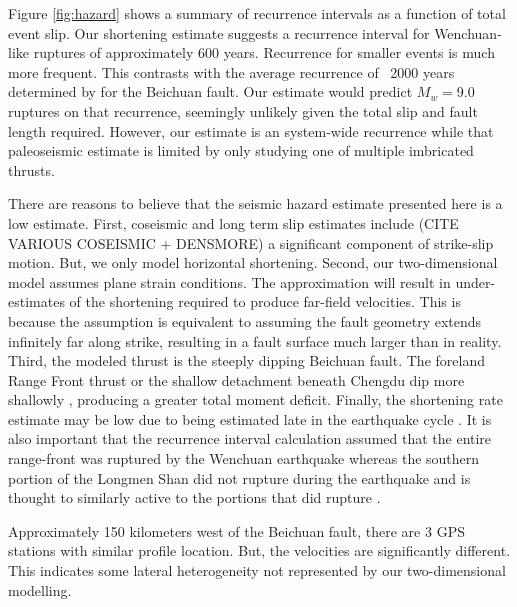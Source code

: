 \documentclass[12pt]{article}
\begin{document}
Figure \ref{fig:hazard} shows a summary of recurrence intervals as a function of total event slip. Our shortening estimate suggests a recurrence interval for Wenchuan-like ruptures of approximately 600 years. Recurrence for smaller events is much more frequent. This contrasts with the average recurrence of ~2000 years determined by \citep{Ran2010} for the Beichuan fault. Our estimate would predict $M_w = $9.0 ruptures on that recurrence, seemingly unlikely given the total slip and fault length required. However, our estimate is an system-wide recurrence while that paleoseismic estimate is limited by only studying one of multiple imbricated thrusts. 

There are reasons to believe that the seismic hazard estimate presented here is a low estimate.  First, coseismic and long term slip estimates include (CITE VARIOUS COSEISMIC + DENSMORE) a significant component of strike-slip motion. But, we only model horizontal shortening.  Second, our two-dimensional model assumes plane strain conditions.  The approximation will result in under-estimates of the shortening required to produce far-field velocities.  This is because the assumption is equivalent to assuming the fault geometry extends infinitely far along strike, resulting in a fault surface much larger than in reality. Third, the modeled thrust is the steeply dipping Beichuan fault. The foreland Range Front thrust or the shallow detachment beneath Chengdu dip more shallowly \citep{Hubbard2010}, producing a greater total moment deficit.  Finally, the shortening rate estimate may be low due to being estimated late in the earthquake cycle \citep{savage00}.  It is also important that the recurrence interval calculation assumed that the entire range-front was ruptured by the Wenchuan earthquake whereas the southern portion of the Longmen Shan did not rupture during the earthquake and is thought to similarly active to the portions that did rupture \citep{Li2010}. 

Approximately 150 kilometers west of the Beichuan fault, there are 3 GPS stations with similar profile location. But, the velocities are significantly different. This indicates some lateral heterogeneity not represented by our two-dimensional modelling. 
\end{document}

